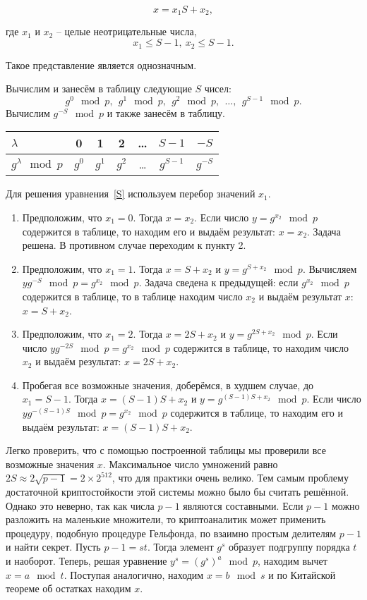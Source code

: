 \begin{equation}
    x=x_{1} S+x_{2},
    \label{S}
\end{equation}

где $x_{1}$ и $x_{2}$ -- целые неотрицательные числа,
    \[ x_{1} \leq S-1, ~ x_{2} \leq S-1. \]

Такое представление является однозначным.

Вычислим и занесём в таблицу следующие $S$ чисел:
    \[ g^{0} \mod p, ~~ g^{1} \mod p, ~~ g^{2} \mod p, ~~ \dots, ~~ g^{S-1} \mod p. \]
Вычислим $g^{-S} \mod p$ и также занесём в таблицу.

\begin{center} \begin{tabular}{|l|c|c|c|c|c|c|}
    \hline
    $\lambda $ & 0 & 1 & 2 & \dots & $S-1$ & $-S$ \\
    \hline
    $g^{\lambda} \mod p$ & $g^{0}$ & $g^{1}$ & $g^{2}$ & \dots & $g^{S-1}$ & $g^{-S}$ \\
    \hline
\end{tabular} \end{center}

Для решения уравнения~\ref{S} используем перебор значений $x_{1}$.
\begin{enumerate}
    \item Предположим, что $x_{1} = 0$. Тогда $x = x_{2}$. Если число $y = g^{x_{2}} \mod p$ содержится в таблице, то находим его и выдаём результат: $x=x_{2} $. Задача решена. В противном случае переходим к пункту 2.
    \item Предположим, что $x_{1} =1$. Тогда $x=S+x_{2} $ и $y=g^{S+x_{2}} \mod p$. Вычисляем $yg^{-S} \mod p=g^{x_{2}} \mod p$. Задача сведена к предыдущей: если $g^{x_{2} } \mod p$ содержится в таблице, то в таблице находим число $x_{2} $ и выдаём результат $x$: $x=S+x_{2} $.
    \item Предположим, что $x_{1} =2$. Тогда $x=2S+x_{2} $ и $y=g^{2S+x_{2} } \mod p$. Если число $yg^{-2S} \mod p=g^{x_{2} } \mod p$ содержится в таблице, то находим число $x_{2}$ и выдаём результат: $x = 2S + x_{2}$.
     \item Пробегая все возможные значения, доберёмся, в худшем случае, до $x_{1} =S-1$. Тогда $x=(S-1)S+x_{2} $ и $y = g^{(S-1)S+x_{2} } \mod p$. Если число $yg^{-(S-1)S} \mod p=g^{x_{2}} \mod p$ содержится в таблице, то находим его и выдаём результат: $x=(S-1)S+x_{2}$.
\end{enumerate}

Легко проверить, что с помощью построенной таблицы мы проверили все возможные значения $x$. Максимальное число умножений равно $2S \approx 2\sqrt{p-1} =2\times 2^{512} $, что для практики очень велико. Тем самым проблему достаточной криптостойкости этой системы можно было бы считать решённой. Однако это неверно, так как числа $p-1$ являются составными. Если $p-1$ можно разложить на маленькие множители, то криптоаналитик может применить процедуру, подобную процедуре Гельфонда, по взаимно простым делителям $p-1$ и найти секрет. Пусть $p-1=st$. Тогда элемент $g^s$ образует подгруппу порядка $t$ и наоборот. Теперь, решая уравнение $y^s=(g^s)^a\mod p$, находим вычет $x=a\mod t$. Поступая аналогично, находим $x=b\mod s$ и по Китайской теореме об остатках находим $x$.

